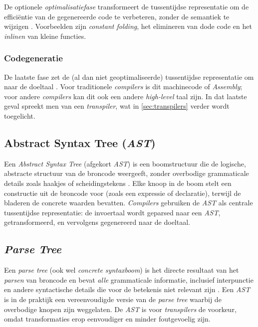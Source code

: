 De optionele \emph{optimalisatiefase} transformeert de tussentijdse representatie om de efficiëntie van de gegenereerde code te verbeteren, zonder de semantiek te wijzigen \autocite{Seidl2012}. Voorbeelden zijn \emph{constant folding}, het elimineren van dode code en het \emph{inlinen} van kleine functies.

\subsubsection{Codegeneratie}%

De laatste fase zet de (al dan niet geoptimaliseerde) tussentijdse representatie om naar de doeltaal \autocite{Seidl2012}. Voor traditionele \emph{compilers} is dit machinecode of \emph{Assembly}; voor andere \emph{compilers} kan dit ook een andere \emph{high-level} taal zijn. In dat laatste geval spreekt men van een \emph{transpiler}, wat in \autoref{sec:transpilers} verder wordt toegelicht.

\subsection{Abstract Syntax Tree (\emph{AST})}%
\label{subsec:ast}

Een \emph{Abstract Syntax Tree} (afgekort \emph{AST}) is een boomstructuur die de logische, abstracte structuur van de broncode weergeeft, zonder overbodige grammaticale details zoals haakjes of scheidingstekens \autocite{Freitas2025}. Elke knoop in de boom stelt een constructie uit de broncode voor (zoals een expressie of declaratie), terwijl de bladeren de concrete waarden bevatten. \emph{Compilers} gebruiken de \emph{AST} als centrale tussentijdse representatie: de invoertaal wordt geparsed naar een \emph{AST}, getransformeerd, en vervolgens gegenereerd naar de doeltaal.

\subsection{\emph{Parse Tree}}%
\label{subsec:parsetree}

Een \emph{parse tree} (ook wel \emph{concrete syntaxboom}) is het directe resultaat van het \emph{parsen} van broncode en bevat \emph{alle} grammaticale informatie, inclusief interpunctie en andere syntactische details die voor de betekenis niet relevant zijn \autocite{Freitas2025}. Een \emph{AST} is in de praktijk een vereenvoudigde versie van de \emph{parse tree} waarbij de overbodige knopen zijn weggelaten. De \emph{AST} is voor \emph{transpilers} de voorkeur, omdat transformaties erop eenvoudiger en minder foutgevoelig zijn.


